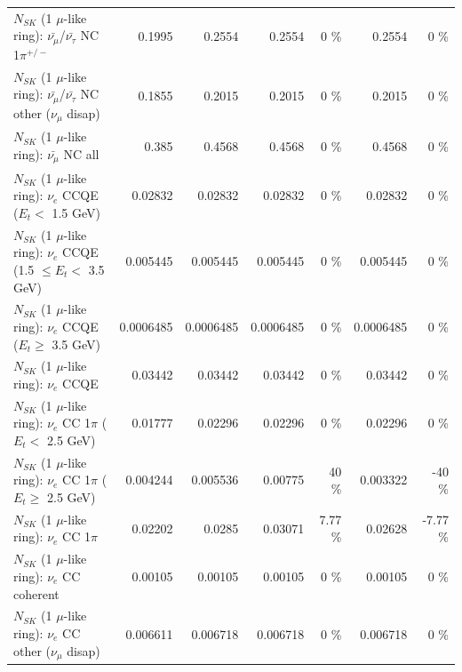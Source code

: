 \begin{table}
\begin{tabular}{| l | r | r | r  r | r  r |}
\hline
  $N_{SK}$ (1 $\mu$-like ring): $\bar{\nu_\mu}$/$\bar{\nu_\tau}$ NC 1$\pi^{+/-}$ &          0.1995 &          0.2554 &          0.2554 &        0 \%  &          0.2554 &        0 \%  \\ 
$N_{SK}$ (1 $\mu$-like ring): $\bar{\nu_\mu}$/$\bar{\nu_\tau}$ NC other ($\nu_\mu$ disap) &          0.1855 &          0.2015 &          0.2015 &        0 \%  &          0.2015 &        0 \%  \\ 
                          $N_{SK}$ (1 $\mu$-like ring): $\bar{\nu_{\mu}}$ NC all &           0.385 &          0.4568 &          0.4568 &        0 \%  &          0.4568 &        0 \%  \\ 
\hline
\hline
\hline
                  $N_{SK}$ (1 $\mu$-like ring): $\nu_e$ CCQE ($E_{t} <$ 1.5 GeV) &         0.02832 &         0.02832 &         0.02832 &        0 \%  &         0.02832 &        0 \%  \\ 
         $N_{SK}$ (1 $\mu$-like ring): $\nu_e$ CCQE (1.5 $\leq E_{t} <$ 3.5 GeV) &        0.005445 &        0.005445 &        0.005445 &        0 \%  &        0.005445 &        0 \%  \\ 
               $N_{SK}$ (1 $\mu$-like ring): $\nu_e$ CCQE ($E_{t} \geq$ 3.5 GeV) &       0.0006485 &       0.0006485 &       0.0006485 &        0 \%  &       0.0006485 &        0 \%  \\ 
\hline
                                      $N_{SK}$ (1 $\mu$-like ring): $\nu_e$ CCQE &         0.03442 &         0.03442 &         0.03442 &        0 \%  &         0.03442 &        0 \%  \\ 
\hline
             $N_{SK}$ (1 $\mu$-like ring): $\nu_e$ CC 1$\pi$ ($E_{t} <$ 2.5 GeV) &         0.01777 &         0.02296 &         0.02296 &        0 \%  &         0.02296 &        0 \%  \\ 
          $N_{SK}$ (1 $\mu$-like ring): $\nu_e$ CC 1$\pi$ ($E_{t} \geq$ 2.5 GeV) &        0.004244 &        0.005536 &         0.00775 &       40 \%  &        0.003322 &      -40 \%  \\ 
\hline
                                 $N_{SK}$ (1 $\mu$-like ring): $\nu_e$ CC 1$\pi$ &         0.02202 &          0.0285 &         0.03071 &     7.77 \%  &         0.02628 &    -7.77 \%  \\ 
                               $N_{SK}$ (1 $\mu$-like ring): $\nu_e$ CC coherent &         0.00105 &         0.00105 &         0.00105 &        0 \%  &         0.00105 &        0 \%  \\ 
                $N_{SK}$ (1 $\mu$-like ring): $\nu_e$ CC other ($\nu_\mu$ disap) &        0.006611 &        0.006718 &        0.006718 &        0 \%  &        0.006718 &        0 \%  \\ 

\end{tabular}
\end{table}
